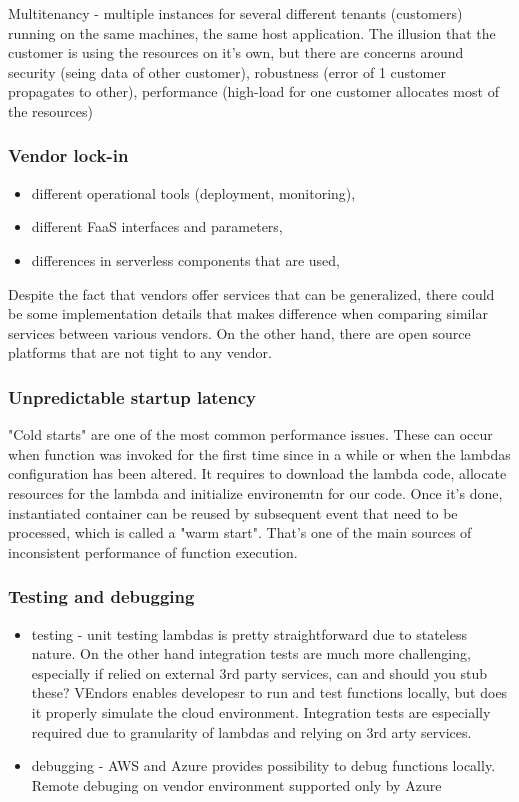 Multitenancy - multiple instances for several different tenants (customers) running on the same machines, the same host application. The illusion that the customer is using the resources on it's own, but there are concerns around security (seing data of other customer), robustness (error of 1 customer propagates to other), performance (high-load for one customer allocates most of the resources)

\subsubsection*{Vendor lock-in}

\begin{itemize}
    \item different operational tools (deployment, monitoring), 
    \item different FaaS interfaces and parameters, 
    \item differences in serverless components that are used, 
\end{itemize}

Despite the fact that vendors offer services that can be generalized, there could be some implementation details that makes difference when comparing similar services between various vendors. On the other hand, there are open source platforms that are not tight to any vendor.

\subsubsection*{Unpredictable startup latency}

"Cold starts" are one of the most common performance issues. These can occur when function was invoked for the first time since in a while or when the lambdas configuration has been altered. It requires to download the lambda code, allocate resources for the lambda and initialize environemtn for our code. Once it's done, instantiated container can be reused by subsequent event that need to be processed, which is called a "warm start". That's one of the main sources of inconsistent performance of function execution.

\subsubsection*{Testing and debugging}

\begin{itemize}
    \item testing - unit testing lambdas is pretty straightforward due to stateless nature. On the other hand integration tests are much more challenging, especially if relied on external 3rd party services, can and should you stub these? VEndors enables developesr to run and test functions locally, but does it properly simulate the cloud environment. Integration tests are especially required due to granularity of lambdas and relying on 3rd arty services.
    \item debugging - AWS and Azure provides possibility to debug functions locally. Remote debuging on vendor environment supported only by Azure
\end{itemize}

